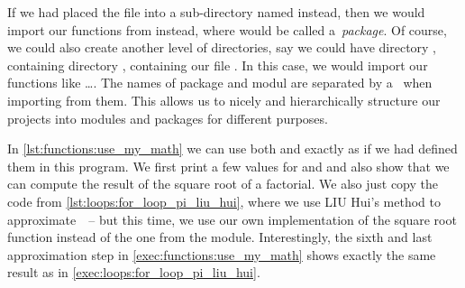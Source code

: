 If we had placed the  file into a sub-directory named  instead, then we would import our functions from  instead, where  would be called a~\emph{package}.
Of course, we could also create another level of directories, say we could have directory , containing directory , containing our file .
In this case, we would import our functions like \dots.
The names of package and modul are separated by a~ when importing from them.
This allows us to nicely and hierarchically structure our projects into modules and packages for different purposes.

In \cref{lst:functions:use_my_math} we can use both  and  exactly as if we had defined them in this program.
We first print a few values for  and  and also show that we can compute the result of the square root of a factorial.
We also just copy the code from \cref{lst:loops:for_loop_pi_liu_hui}, where we use LIU Hui's method to approximate~\numberPi\ -- but this time, we use our own implementation of the square root function instead of the one from the  module.
Interestingly, the sixth and last approximation step in \cref{exec:functions:use_my_math} shows exactly the same result as in \cref{exec:loops:for_loop_pi_liu_hui}.%
%
\FloatBarrier%
\endhsection%
%
\endhsection%
%
